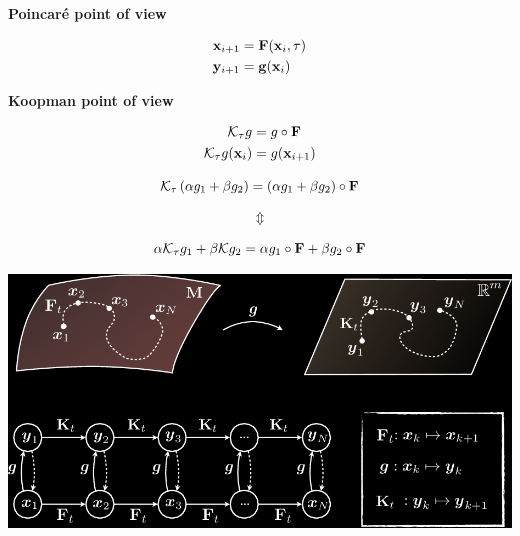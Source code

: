\documentclass[aspectratio=169, usenames, dvipsnames]{beamer}
\begin{document}
\begin{frame}
  \vfill
  \begin{minipage}{.48\textwidth}
    \centering
    \textbf{Poincaré point of view}

    \[
      \begin{aligned}
        \vb{x}_{i+1} & = \vb{F}(\vb{x}_i, \tau) \\
        \vb{y}_{i+1} & = \vb{g}(\vb{x}_i)
      \end{aligned}
    \]
  \end{minipage}%
  \hfill
  \begin{minipage}{.48\textwidth}
    \centering
    \textbf{Koopman point of view}

    \[
      \begin{aligned}
        \mathcal{K}_{\tau} g & = g \circ \vb{F} \\
        \mathcal{K}_{\tau} g(\vb{x}_{i}) & = g(\vb{x}_{i+1})
      \end{aligned}
    \]
  \end{minipage}
  \vfill
\end{frame}

\begin{frame}
  \vfill
  {
    \Large
    \[
      \mathcal{K}_{\tau} \left(  \alpha g_1 + \beta g_2 \right) = \left( \alpha g_1 + \beta g_2 \right) \circ \vb{F}
    \]

    \[
      \Updownarrow
    \]

    \[
      \alpha \mathcal{K}_{\tau} g_1 + \beta \mathcal{K} g_2 = \alpha g_1 \circ \vb{F} + \beta g_2 \circ \vb{F}
    \]
  }
  \vfill
\end{frame}

\begin{frame}
  \vfill
  \centering

  \includegraphics[width=\textwidth]{koopman_operator}
  
  \vfill
\end{frame}
\end{document}
